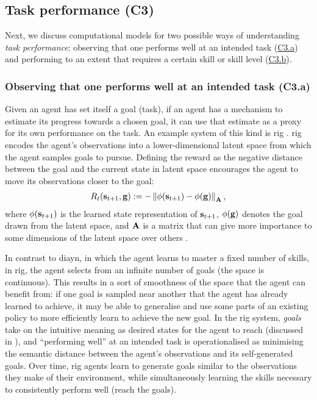 \documentclass[10pt,letterpaper]{article}
\begin{document}
\subsection{Task performance (C3)}
\label{sec:taskperformance}

Next, we discuss computational models for two possible ways of understanding \emph{task performance}: observing that one performs well at an intended task (\hyperref[sec:c3a]{C3.a}) and performing to an extent that requires a certain skill or skill level (\hyperref[sec:c3b]{C3.b}).


\subsubsection{Observing that one performs well at an intended task (C3.a)}
 \label{sec:c3a}

Given an agent has set itself a goal (task), if an agent has a mechanism to estimate its progress towards a chosen goal, it can use that estimate as a proxy for its own performance on the task. An example system of this kind is \gls{rig} \citep{nair2018visual}. \Gls{rig} encodes the agent's observations into a lower-dimensional latent space from which the agent samples goals to pursue. Defining the reward as the negative distance between the goal and the current state in latent space encourages the agent to move its observations closer to the goal:
\begin{align}\label{eq:rig}
R_t({\mathbf{s}}_{t+1}, {\mathbf{g}}) := -\left\lVert\phi({\mathbf{s}}_{t+1})-\phi({\mathbf{g}})\right\rVert_{\mathbf{A}},
\end{align}
where $\phi({\mathbf{s}}_{t+1})$ is the learned state representation of ${\mathbf{s}}_{t+1}$, $\phi({\mathbf{g}})$ denotes the goal drawn from the latent space, and ${\mathbf{A}}$ is a matrix that can give more importance to some dimensions of the latent space over others \citep[p.~5]{nair2018visual}.

In contrast to \gls{diayn}, in which the agent learns to master a fixed number of skills, in \gls{rig}, the agent selects from an infinite number of goals (the space is continuous). This results in a sort of smoothness of the space that the agent can benefit from: if one goal is sampled near another that the agent has already learned to achieve, it may be able to generalise and use some parts of an existing policy to more efficiently learn to achieve the new goal. In the \gls{rig} system, \emph{goals} take on the intuitive meaning as desired states for the agent to reach (discussed in ), and ``performing well'' at an intended task is operationalised as minimising the semantic distance between the agent's observations and its self-generated goals. Over time, \gls{rig} agents learn to generate goals similar to the observations they make of their environment, while simultaneously learning the skills necessary to consistently perform well (reach the goals).
\end{document}
